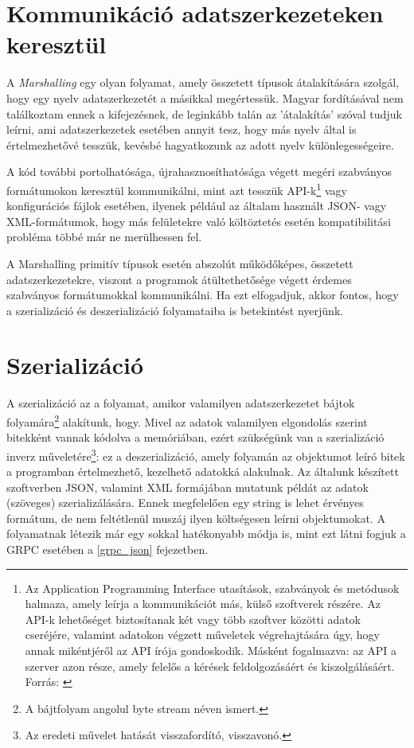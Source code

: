 \documentclass[tocnopagenum]{thesis-ekf}
\begin{document}
	\section{Kommunikáció adatszerkezeteken keresztül}
	A \emph{Marshalling} egy olyan folyamat, amely összetett típusok átalakítására szolgál, hogy egy nyelv adatszerkezetét a másikkal megértessük. Magyar fordításával nem találkoztam ennek a kifejezésnek, de leginkább talán az 'átalakítás' szóval tudjuk leírni, ami adatszerkezetek esetében annyit tesz, hogy más nyelv által is értelmezhetővé tesszük, kevésbé hagyatkozunk az adott nyelv különlegességeire.\cite{sof_marshalling}
	\par
	A kód további portolhatósága, újrahasznosíthatósága végett megéri szabványos formátumokon keresztül kommunikálni, mint azt tesszük API-k\footnote{Az Application Programming Interface utasítások, szabványok és metódusok halmaza, amely leírja a kommunikációt más, külső szoftverek részére. Az API-k lehetőséget biztosítanak két vagy több szoftver közötti adatok cseréjére, valamint adatokon végzett műveletek végrehajtására úgy, hogy annak mikéntjéről az API írója gondoskodik. Másként fogalmazva: az API a szerver azon része, amely felelős a kérések feldolgozásáért és kiszolgálásáért. Forrás: \cite{api}} vagy konfigurációs fájlok esetében, ilyenek például az általam használt JSON- vagy XML-formátumok,  hogy más felületekre való költöztetés esetén kompatibilitási probléma többé már ne merülhessen fel.
	
	A Marshalling primitív típusok esetén abszolút működőképes, összetett adatszerkezetekre, viszont a programok átültethetősége végett érdemes szabványos formátumokkal kommunikálni. Ha ezt elfogadjuk, akkor fontos, hogy a szerializáció és deszerializáció folyamataiba is betekintést nyerjünk.
	\section{Szerializáció}
	A szerializáció az a folyamat, amikor valamilyen adatszerkezetet bájtok folyamára\footnote{A bájtfolyam angolul byte stream néven ismert.} alakítunk, hogy. Mivel az adatok valamilyen elgondolás szerint bitekként vannak kódolva a memóriában, ezért szükségünk van a szerializáció inverz műveletére\footnote{Az eredeti művelet hatását visszafordító, visszavonó.}: ez a deszerializáció, amely folyamán az objektumot leíró bitek a programban értelmezhető, kezelhető adatokká alakulnak. Az általunk készített szoftverben JSON, valamint XML formájában mutatunk példát az adatok (szöveges) szerializálására. Ennek megfelelően egy string is lehet érvényes formátum, de nem feltétlenül muszáj ilyen költségesen leírni objektumokat. A folyamatnak létezik már egy sokkal hatékonyabb módja is, mint ezt látni fogjuk a GRPC esetében a \ref{grpc_json} fejezetben.
	
\end{document}
